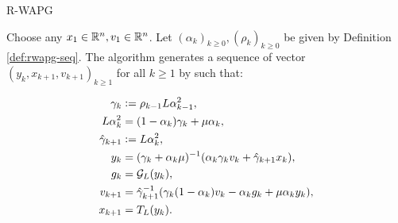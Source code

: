 \documentclass[11pt]{beamer}
\theoremstyle{definition}
\begin{document}
        \begin{frame}{R-WAPG}
            \begin{definition}[R-WAPG]\label{def:wapg}
                Choose any $x_1 \in \mathbb R^n, v_1 \in \mathbb R^n$.
                Let $(\alpha_k)_{k \ge0}, (\rho_k)_{k \ge 0}$ be given by Definition \ref{def:rwapg-seq}.
                The algorithm generates a sequence of vector $(y_k, x_{k + 1}, v_{k + 1})_{k \ge 1}$ for all $k\ge 1$ by such that:
                \begin{tcolorbox}\vspace{-1em}
                    \begin{align*}
                        \gamma_k &\vcentcolon= \rho_{k -1}L\alpha_{k - 1}^2,
                        \\
                        L\alpha_k^2 &= (1 - \alpha_k)\gamma_k + \mu \alpha_k, 
                        \\
                        \hat \gamma_{k + 1} & \vcentcolon= L\alpha_k^2,
                        \\
                        y_k &=
                        (\gamma_k + \alpha_k \mu)^{-1}(\alpha_k \gamma_k v_k + \hat\gamma_{k + 1} x_k),
                        \\
                        g_k &= \mathcal G_L (y_k),
                        \\
                        v_{k + 1} &=
                        \hat\gamma^{-1}_{k + 1}
                        (\gamma_k(1 - \alpha_k) v_k - \alpha_k g_k + \mu \alpha_k y_k),
                        \\
                        x_{k + 1} &= T_L (y_k).
                    \end{align*}
                \end{tcolorbox}
            \end{definition}
        \end{frame}
\end{document}
